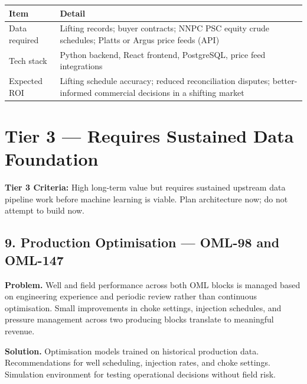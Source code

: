 \documentclass[10pt]{article}
\newcommand{\spacer}{\vspace{10pt}}
\newcommand{\bigspacer}{\vspace{16pt}}
\begin{document}
\spacer
\small
\begin{tabularx}{\columnwidth}{@{}lX@{}}
\toprule
\textbf{Item} & \textbf{Detail} \\
\midrule
Data required     & Lifting records; buyer contracts; NNPC PSC equity
                    crude schedules; Platts or Argus price feeds (API) \\
Tech stack        & Python backend, React frontend, PostgreSQL, price
                    feed integrations \\
Expected ROI      & Lifting schedule accuracy; reduced reconciliation
                    disputes; better-informed commercial decisions in
                    a shifting market \\
\bottomrule
\end{tabularx}
\normalsize

\bigspacer

\section{Tier 3 --- Requires Sustained Data Foundation}

\noindent\colorbox{tier3!10}{%
\begin{minipage}{\dimexpr\textwidth-2\fboxsep}
  \vspace{4pt}
  {\small\color{tier3}\textbf{Tier 3 Criteria:}
  High long-term value but requires sustained upstream data pipeline work
  before machine learning is viable. Plan architecture now; do not attempt
  to build now.}
  \vspace{4pt}
\end{minipage}}

\bigspacer

\subsection*{9. Production Optimisation --- OML-98 and OML-147}

\textbf{Problem.}
Well and field performance across both OML blocks is managed based on
engineering experience and periodic review rather than continuous
optimisation. Small improvements in choke settings, injection schedules,
and pressure management across two producing blocks translate to meaningful
revenue.

\textbf{Solution.}
Optimisation models trained on historical production data. Recommendations
for well scheduling, injection rates, and choke settings. Simulation
environment for testing operational decisions without field risk.
\end{document}
